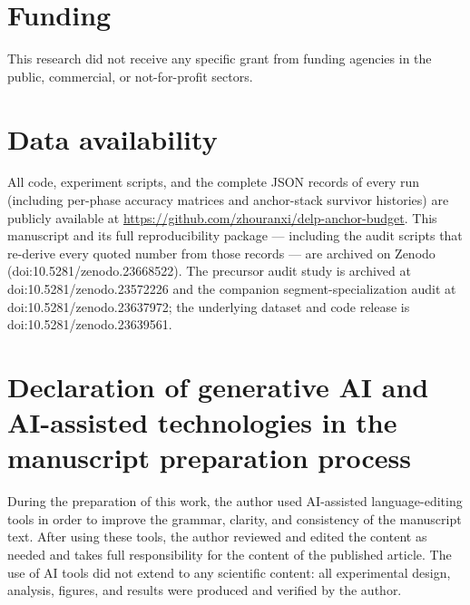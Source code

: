 \documentclass[review,11pt,number]{elsarticle}
\begin{document}
\section*{Funding}
This research did not receive any specific grant from funding agencies
in the public, commercial, or not-for-profit sectors.

\begin{sloppypar}
\section*{Data availability}
All code, experiment scripts, and the complete JSON records of every
run (including per-phase accuracy matrices and anchor-stack survivor
histories) are publicly available at
\url{https://github.com/zhouranxi/delp-anchor-budget}. This manuscript
and its full reproducibility package --- including the audit scripts
that re-derive every quoted number from those records --- are archived
on Zenodo (doi:10.5281/zenodo.23668522). The precursor audit study is
archived at doi:10.5281/zenodo.23572226 and the companion
segment-specialization audit at doi:10.5281/zenodo.23637972; the
underlying dataset and code release is
doi:10.5281/zenodo.23639561.
\end{sloppypar}

\section*{Declaration of generative AI and AI-assisted
technologies in the manuscript preparation process}
During the preparation of this work, the author used AI-assisted
language-editing tools in order to improve the grammar, clarity, and
consistency of the manuscript text. After using these tools, the
author reviewed and edited the content as needed and takes full
responsibility for the content of the published article. The use of
AI tools did not extend to any scientific content: all experimental
design, analysis, figures, and results were produced and verified by
the author.



\end{document}
